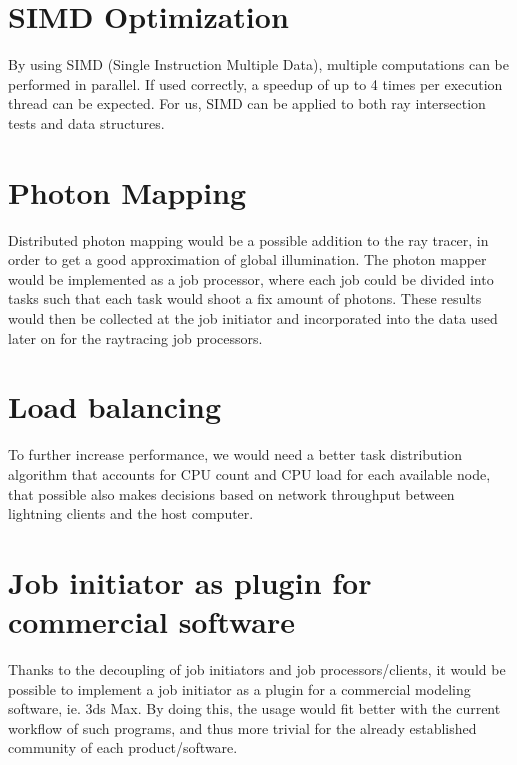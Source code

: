 \section{SIMD Optimization}
By using SIMD (Single Instruction Multiple Data), multiple computations can be performed in parallel. If used correctly, a speedup of up to 4 times per execution thread can be expected. For us, SIMD can be applied to both ray intersection tests and data structures.


\section{Photon Mapping}
Distributed photon mapping would be a possible addition to the ray tracer, in order to get a good approximation of global illumination. The photon mapper would be implemented as a job processor, where each job could be divided into tasks such that each task would shoot a fix amount of photons. These results would then be collected at the job initiator and incorporated into the data used later on for the raytracing job processors.

\section{Load balancing}
To further increase performance, we would need a better task distribution algorithm that accounts for CPU count and CPU load for each available node, that possible also makes decisions based on network throughput between lightning clients and the host computer.

\section{Job initiator as plugin for commercial software}
Thanks to the decoupling of job initiators and job processors/clients, it would be possible to implement a job initiator as a plugin for a commercial modeling software, ie. 3ds Max. By doing this, the usage would fit better with the current workflow of such programs, and thus more trivial for the already established community of each product/software.

